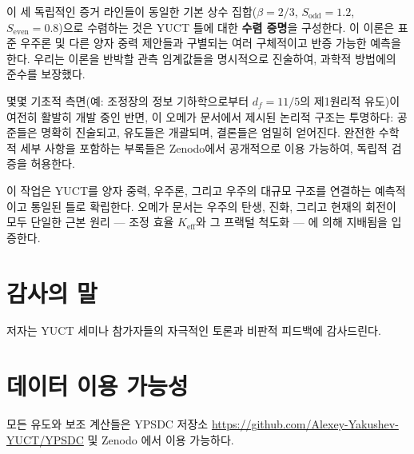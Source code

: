 \documentclass[11pt,a4paper]{article}
\begin{document}
이 세 독립적인 증거 라인들이 동일한 기본 상수 집합(\(\beta = 2/3\), \(S_{\mathrm{odd}}=1.2\), \(S_{\mathrm{even}}=0.8\))으로 수렴하는 것은 YUCT 틀에 대한 \textbf{수렴 증명}을 구성한다. 이 이론은 표준 우주론 및 다른 양자 중력 제안들과 구별되는 여러 구체적이고 반증 가능한 예측을 한다. 우리는 이론을 반박할 관측 임계값들을 명시적으로 진술하여, 과학적 방법에의 준수를 보장했다.

몇몇 기초적 측면(예: 조정장의 정보 기하학으로부터 \(d_f = 11/5\)의 제1원리적 유도)이 여전히 활발히 개발 중인 반면, 이 오메가 문서에서 제시된 논리적 구조는 투명하다: 공준들은 명확히 진술되고, 유도들은 개괄되며, 결론들은 엄밀히 얻어진다. 완전한 수학적 세부 사항을 포함하는 부록들은 Zenodo에서 공개적으로 이용 가능하여, 독립적 검증을 허용한다.

이 작업은 YUCT를 양자 중력, 우주론, 그리고 우주의 대규모 구조를 연결하는 예측적이고 통일된 틀로 확립한다. 오메가 문서는 우주의 탄생, 진화, 그리고 현재의 회전이 모두 단일한 근본 원리 — 조정 효율 \(K_{\mathrm{eff}}\)와 그 프랙털 척도화 — 에 의해 지배됨을 입증한다.


\section*{감사의 말}

저자는 YUCT 세미나 참가자들의 자극적인 토론과 비판적 피드백에 감사드린다.

\section*{데이터 이용 가능성}

모든 유도와 보조 계산들은 YPSDC 저장소 \url{https://github.com/Alexey-Yakushev-YUCT/YPSDC} 및 Zenodo \cite{AppendixL,AppendixY,AppendixP,AppendixM,AppendixΩ,AppendixB}에서 이용 가능하다.
\end{document}
